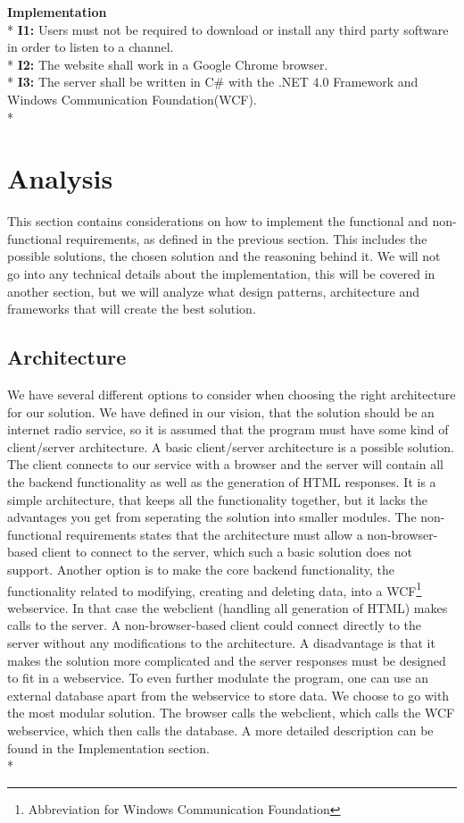 \documentclass[a4paper,11pt,report]{article}
\begin{document}
\textbf{Implementation} \\*
\textbf{I1:} Users must not be required to download or install any third party software in order to listen to a channel. \\*
\textbf{I2:} The website shall work in a Google Chrome browser. \\*
\textbf{I3:} The server shall be written in C\# with the .NET 4.0 Framework and Windows Communication Foundation(WCF). \\*

\section{Analysis}
This section contains considerations on how to implement the functional and non-functional requirements, as defined in the previous section. This includes the possible solutions, the chosen solution and the reasoning behind it. We will not go into any technical details about the implementation, this will be covered in another section, but we will analyze what design patterns, architecture and frameworks that will create the best solution. 

\subsection{Architecture}
We have several different options to consider when choosing the right architecture for our solution. We have defined in our vision, that the solution should be an internet radio service, so it is assumed that the program must have some kind of client/server architecture. A basic client/server architecture is a possible solution. The client connects to our service with a browser and the server will contain all the backend functionality as well as the generation of HTML responses. It is a simple architecture, that keeps all the functionality together, but it lacks the advantages you get from seperating the solution into smaller modules. The non-functional requirements states that the architecture must allow a non-browser-based client to connect to the server, which such a basic solution does not support. Another option is to make the core backend functionality, the functionality related to modifying, creating and deleting data, into a WCF\footnote{Abbreviation for Windows Communication Foundation} webservice. In that case the webclient (handling all generation of HTML) makes calls to the server. A non-browser-based client could connect directly to the server without any modifications to the architecture. A disadvantage is that it makes the solution more complicated and the server responses must be designed to fit in a webservice. To even further modulate the program, one can use an external database apart from the webservice to store data. We choose to go with the most modular solution. The browser calls the webclient, which calls the WCF webservice, which then calls the database. A more detailed description can be found in the Implementation section. \\*
\end{document}
